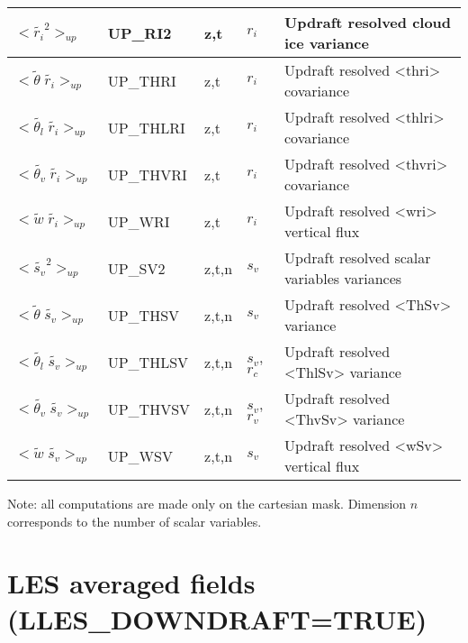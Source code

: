 \begin{longtable}[c]{|p{}|p{}|p{}|p{}|p{}|}
$<{\tilde{r_i}}^2>_{up}$                      & UP\_RI2   & z,t   & $r_i$ & Updraft resolved cloud ice variance \\\hline
$<{\tilde{\theta}\;\tilde{r_i}}>_{up}$        & UP\_THRI  & z,t   & $r_i$ & Updraft resolved <thri> covariance \\\hline
$<{\tilde{\theta_l}\;\tilde{r_i}}>_{up}$      & UP\_THLRI & z,t   & $r_i$ & Updraft resolved <thlri> covariance \\\hline
$<{\tilde{\theta_v}\;\tilde{r_i}}>_{up}$      & UP\_THVRI & z,t   & $r_i$ & Updraft resolved <thvri> covariance \\\hline
$<{\tilde{w}\;\tilde{r_i}}>_{up}$             & UP\_WRI   & z,t   & $r_i$ & Updraft resolved <wri> vertical flux \\\hline
$<{\tilde{s_v}}^2>_{up}$                      & UP\_SV2   & z,t,n & $s_v$ & Updraft resolved scalar variables variances \\\hline
$<{\tilde{\theta}\;\tilde{s_v}}>_{up}$        & UP\_THSV  & z,t,n & $s_v$ & Updraft resolved <ThSv> variance \\\hline
$<{\tilde{\theta_l}\;\tilde{s_v}}>_{up}$      & UP\_THLSV & z,t,n & $s_v$, $r_c$ & Updraft resolved <ThlSv> variance \\\hline
$<{\tilde{\theta_v}\;\tilde{s_v}}>_{up}$      & UP\_THVSV & z,t,n & $s_v$, $r_v$ & Updraft resolved <ThvSv> variance \\\hline
$<{\tilde{w}\;\tilde{s_v}}>_{up}$             & UP\_WSV   & z,t,n & $s_v$ & Updraft resolved <wSv> vertical flux \\\hline
\end{longtable}

Note: all computations are made only on the cartesian mask. Dimension $n$ corresponds to the number of scalar variables.


\section{LES averaged fields (LLES\_DOWNDRAFT=TRUE)}

